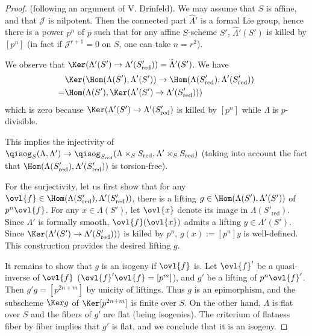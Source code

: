 \begin{proof}
 (following an argument of V. Drinfeld). We may assume that $S$ is
 affine, and that $\mathcal{J}$ is nilpotent. Then the connected part
 ${\hat\Lambda'}$ is a formal Lie group, hence there is a power $p^n$ of
 $p$ such that for any affine $S$-scheme $S'$, ${\hat\Lambda}'(S')$ is
 killed by $[p^n]$ (in fact if $\mathcal{J}^{r+1}=0$ on $S$, one can take
 $n=r^2$).

 We observe that $\Ker(\Lambda'(S')\rightarrow
 \Lambda'(S'_{\mathrm{red}}))= {\hat\Lambda}'(S')$. We have
 \begin{align*}
 &\Ker(\Hom(\Lambda(S') ,
 \Lambda'(S'))\rightarrow \Hom(\Lambda(
 S'_{\mathrm{red}}) , \Lambda'(S'_{\mathrm{red}}) )\\
 =&
 \Hom (\Lambda(S') ,\Ker(\Lambda'(S')
 \rightarrow \Lambda'(S'_{\mathrm{red}}))) 
 \end{align*}
 which is zero because $\Ker(\Lambda'(S')\rightarrow
 \Lambda'(S'_{\mathrm{red}})$ is killed by $[p^n]$ while $\Lambda$ is
 $p$-divisible.

 \noindent This implies the injectivity of
 $\qisog_S(\Lambda , \Lambda') \rightarrow 
 \qisog_{S_{\mathrm{red}}}(\Lambda\times_S S_{\mathrm{red}} ,
 \Lambda'\times_S S_{\mathrm{red}}) $ (taking into account the fact that 
 $\Hom(\Lambda( S'_{\mathrm{red}}), \Lambda'(S'_{\mathrm{red}}) )$ is
 torsion-free).

 \noindent For the surjectivity, let us first show that for any
 ${\ovl{f}}\in \Hom(\Lambda(S'_{\mathrm{red}}),
 \Lambda'(S'_{\mathrm{red}}))$, there is 
 a lifting $g\in \Hom(\Lambda(S'), \Lambda'(S'))$ of $p^n {\ovl{f}}$. For
 any $x\in \Lambda( S')$, let $\ovl{x}$ denote its image in $\Lambda(
 S'_{\mathrm{red}})$. Since $\Lambda'$ is formally smooth,
 ${\ovl{f}}({\ovl{x}})$ 
 admits a lifting $y\in \Lambda'(S')$.  Since
 $\Ker(\Lambda'(S')\rightarrow \Lambda'(S'_{\mathrm{red}}))) $ is killed
 by $p^n$, 
 $g(x):=[p^n] y$ is well-defined. This construction provides the desired
 lifting $g$.

 It remains to show that $g$ is an isogeny if
 $\ovl{f}$ is. Let $\ovl{f}'$ be a quasi-inverse of $\ovl{f}$
 ($\ovl{f}'\ovl{f}=[p^m]$), and $g'$ be a lifting of $p^n\ovl{f}'$. Then
 $g'g=[p^{2n+m}]$ by unicity of liftings. Thus $g$ is an epimorphism, and
 the subscheme $\Ker g$ of $\Ker [p^{2n+m}]$ is finite over $S$. On the
 other hand, $\Lambda$ is flat over $S$ and the fibers of $g'$ are flat
 (being isogenies). The criterium of flatness fiber by fiber
 \cite[11.3.10]{ega44} implies that $g'$ is flat, and we conclude that
 it is an isogeny.
\end{proof}

